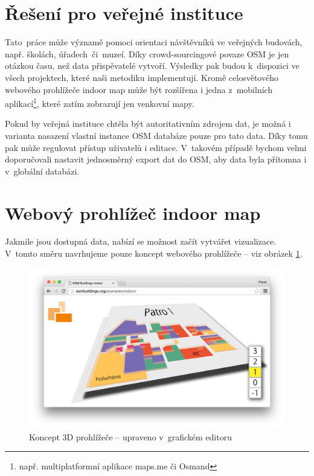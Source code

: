 \section{Řešení pro veřejné instituce}\label{ux159eux161enuxed-pro-veux159ejnuxe9-instituce}

Tato~práce může významě pomoci orientaci návštěvníků ve veřejných budovách, např. školách, úřadech~či~muzeí. Díky crowd-sourcingové povaze OSM je jen otázkou času, než data přispěvatelé vytvoří. Výsledky pak budou k~dispozici ve všech projektech, které naši metodiku implementují. Kromě celosvětového webového prohlížeče indoor map může být rozšířena i jedna z~mobilních aplikací\footnote{např. multiplatformní aplikace maps.me či Osmand}, které zatím zobrazují jen venkovní mapy.

Pokud by veřejná instituce chtěla být autoritativním zdrojem dat, je možná i varianta nasazení vlastní instance OSM databáze pouze pro tato data. Díky tomu pak může regulovat přístup uživatelů i editace. V~takovém případě bychom velmi doporučovali nastavit jednosměrný export dat do OSM, aby data byla přítomna i v~globální databázi.

\section{Webový prohlížeč indoor map}\label{webovuxfd-prohluxedux17eeux10d-indoor-map}

Jakmile jsou dostupná data, nabízí se možnost začít vytvářet vizualizace. V~tomto směru navrhujeme pouze koncept webového prohlížeče -- viz obrázek \ref{obr42}.

 \begin{figure}
	  \centering
      \includegraphics[width=\textwidth]{img/42-osmbuilding-indoor-upraveny.png}
      \caption{Koncept 3D prohlížeče -- upraveno v~grafickém editoru}
      \label{obr42}
  \end{figure}

